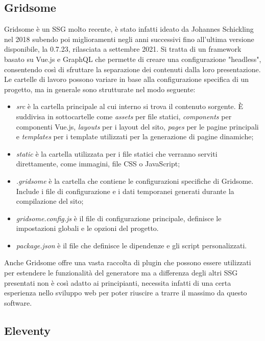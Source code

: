 \documentclass[target=bach,aauheader=]{thud}
\begin{document}
\subsection{Gridsome}
Gridsome è un SSG molto recente, è stato infatti ideato da Johannes Schickling nel 2018 subendo poi miglioramenti negli anni successivi fino all'ultima versione disponibile, la 0.7.23, rilasciata a settembre 2021.
Si tratta di un framework basato su Vue.js e GraphQL che permette di creare una configurazione "headless", consentendo così di sfruttare la separazione dei contenuti dalla loro presentazione.
Le cartelle di lavoro possono variare in base alla configurazione specifica di un progetto, ma in generale sono strutturate nel modo seguente:

\begin{itemize}
    \item \textit{src} è la cartella principale al cui interno si trova il contenuto sorgente. È suddivisa in sottocartelle come \textit{assets} per file statici, \textit{components} per componenti Vue.js, \textit{layouts} per i layout del sito, \textit{pages} per le pagine principali e \textit{templates} per i template utilizzati per la generazione di pagine dinamiche;
    \item \textit{static} è la cartella utilizzata per i file statici che verranno serviti direttamente, come immagini, file CSS o JavaScript;
    \item \textit{.gridsome} è la cartella che contiene le configurazioni specifiche di Gridsome. Include i file di configurazione e i dati temporanei generati durante la compilazione del sito;
    \item \textit{gridsome.config.js} è il file di configurazione principale, definisce le impostazioni globali e le opzioni del progetto.
    \item \textit{package.json} è il file che definisce le dipendenze e gli script personalizzati.
\end{itemize}
Anche Gridsome offre una vasta raccolta di plugin che possono essere utilizzati per estendere le funzionalità del generatore ma a differenza degli altri SSG presentati non è così adatto ai principianti, necessita infatti di una certa esperienza nello sviluppo web per poter riuscire a trarre il massimo da questo software.

\subsection{Eleventy}
\end{document}
